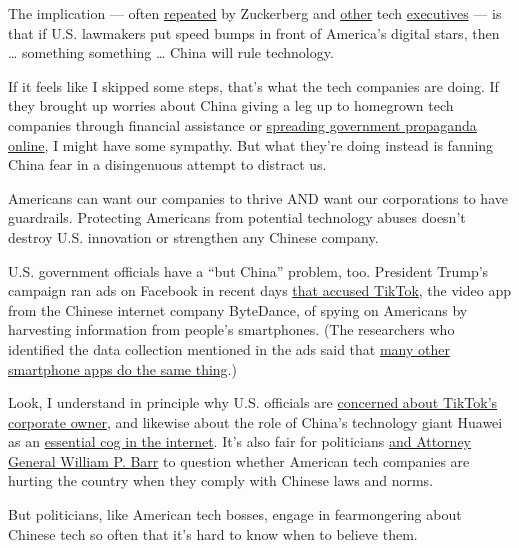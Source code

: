 The implication --- often
\href{https://techcrunch.com/2019/07/17/facebook-or-china/}{repeated} by
Zuckerberg and
\href{https://www.wired.com/story/big-tech-breaking-will-only-help-china/}{other}
tech
\href{https://www.cnn.com/2019/06/14/tech/sundar-pichai-google-antitrust/index.html}{executives}
--- is that if U.S. lawmakers put speed bumps in front of America's
digital stars, then \ldots{} something something \ldots{} China will
rule technology.

If it feels like I skipped some steps, that's what the tech companies
are doing. If they brought up worries about China giving a leg up to
homegrown tech companies through financial assistance or
\href{https://www.nytimes3xbfgragh.onion/2020/04/22/us/politics/coronavirus-china-disinformation.html}{spreading
government propaganda online}, I might have some sympathy. But what
they're doing instead is fanning China fear in a disingenuous attempt to
distract us.

Americans can want our companies to thrive AND want our corporations to
have guardrails. Protecting Americans from potential technology abuses
doesn't destroy U.S. innovation or strengthen any Chinese company.

U.S. government officials have a ``but China'' problem, too. President
Trump's campaign ran ads on Facebook in recent days
\href{https://www.cnn.com/2020/07/19/politics/trump-campaign-ads-facebook-tiktok}{that
accused TikTok}, the video app from the Chinese internet company
ByteDance, of spying on Americans by harvesting information from
people's smartphones. (The researchers who identified the data
collection mentioned in the ads said that
\href{https://www.mysk.blog/2020/03/10/popular-iphone-and-ipad-apps-snooping-on-the-pasteboard/}{many
other smartphone apps do the same thing}.)

Look, I understand in principle why U.S. officials are
\href{https://www.nytimes3xbfgragh.onion/2020/07/15/technology/tiktok-washington-lobbyist.html}{concerned
about TikTok's corporate owner}, and likewise about the role of China's
technology giant Huawei as an
\href{https://www.nytimes3xbfgragh.onion/2020/07/14/business/huawei-uk-5g.html}{essential
cog in the internet}. It's also fair for politicians
\href{https://www.nytimes3xbfgragh.onion/2020/07/16/us/politics/barr-china.html}{and
Attorney General William P. Barr} to question whether American tech
companies are hurting the country when they comply with Chinese laws and
norms.

But politicians, like American tech bosses, engage in fearmongering
about Chinese tech so often that it's hard to know when to believe them.

